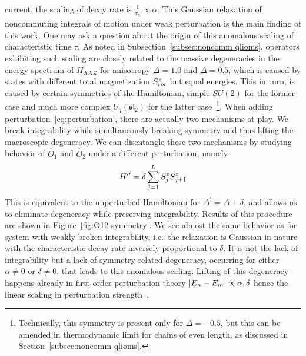 current, the scaling of decay rate is \(\frac{1}{\tau_{\mu}} \propto \alpha\). This Gaussian relaxation
of noncommuting integrals of motion under weak perturbation is the main finding of this work.
One may ask a question about the origin of this anomalous scaling of characteristic time
\(\tau\). As noted in Subsection~\ref{subsec:noncomm qlioms}, operators exhibiting such scaling
are closely related to the massive degeneracies in the energy spectrum of \(H_{XXZ}\) for
anisotropy  \(\Delta=1.0\) and \(\Delta = 0.5\), which is caused by states with
different total magnetization \(S^{z}_{tot}\) but
equal energies. This in turn, is caused by certain symmetries of the Hamiltonian, simple \(SU(2)\) for
the former case and much more complex \(U_q(\mathfrak{sl}_2)\) for the latter 
case~\footnote{Technically, this symmetry is present only for \(\Delta=-0.5\), but this
can be amended in thermodynamic limit for chains of even length, as discussed in 
Section~\ref{subsec:noncomm qlioms}. }. 
When adding perturbation~\eqref{eq:perturbation}, there are actually two mechanisms at play. We break
integrability while simultaneously breaking symmetry and thus lifting the macroscopic degeneracy.
We can disentangle these two mechanisms by studying behavior of \(\hat{O}_1\) and \(\hat{O}_2\)
under a different perturbation, namely
\begin{equation}
  H^{\prime\prime} = \delta \sum_{j=1}^{L} S^{z}_j S^{z}_{j+1}
\end{equation}
This is equivalent to the unperturbed Hamiltonian for \(\Delta^{\prime} = \Delta + \delta\),
and allows us to eliminate degeneracy while preserving integrability. Results of this procedure
are shown in Figure~\ref{fig:O12 symmetry}. We see almost the same behavior as for system
with weakly broken integrability, i.e.\ the relaxation is Gaussian in nature with the
characteristic decay rate inversely proportional to \(\delta\). It is not the lack of
integrability but a lack of symmetry-related degeneracy, occurring for either \(\alpha\neq 0\)
or \(\delta\neq 0\), that leads to this anomalous scaling. Lifting of this degeneracy
happens already in first-order perturbation theory \(\abs{E_n-E_m} \propto \alpha,\delta\)
hence the linear scaling in perturbation strength~\autocite{Mierzejewski2021}.

